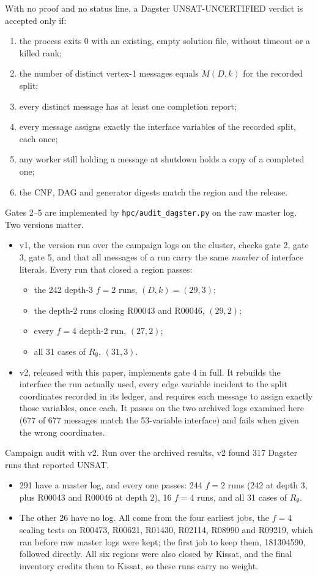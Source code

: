 \documentclass[11pt,a4paper,oneside]{report}
\theoremstyle{definition}
\newcommand{\code}[1]{\texttt{#1}}
\newcommand{\st}[1]{\textsf{#1}}
\begin{document}
With no proof and no status line, a Dagster \st{UNSAT-UNCERTIFIED} verdict is accepted only if:
\begin{enumerate}
\item the process exits 0 with an existing, empty solution file, without timeout or a killed rank;
\item the number of distinct vertex-1 messages equals $M(D,k)$ for the recorded split;
\item every distinct message has at least one completion report;
\item every message assigns exactly the interface variables of the recorded split, each once;
\item any worker still holding a message at shutdown holds a copy of a completed one;
\item the CNF, DAG and generator digests match the region and the release.
\end{enumerate}
Gates 2--5 are implemented by \code{hpc/audit\_dagster.py} on the raw master log. Two versions
matter.
\begin{itemize}
\item v1, the version run over the campaign logs on the cluster, checks gate 2, gate 3,
gate 5, and that all messages of a run carry the same \emph{number} of interface literals. Every
run that closed a region passes:
\begin{itemize}
\item the 242 depth-3 $f=2$ runs, $(D,k)=(29,3)$;
\item the depth-2 runs closing R00043 and R00046, $(29,2)$;
\item every $f=4$ depth-2 run, $(27,2)$;
\item all 31 cases of $R_\emptyset$, $(31,3)$.
\end{itemize}
\item v2, released with this paper, implements gate 4 in full. It rebuilds the
interface the run actually used, every edge variable incident to the split coordinates recorded
in its ledger, and requires each message to assign exactly those variables, once each. It passes
on the two archived logs examined here (677 of 677 messages match the 53-variable interface) and
fails when given the wrong coordinates.
\end{itemize}
Campaign audit with v2. Run over the archived results, v2 found 317 Dagster runs that
reported UNSAT.
\begin{itemize}
\item 291 have a master log, and every one passes: 244 $f=2$ runs (242 at depth 3, plus
R00043 and R00046 at depth 2), 16 $f=4$ runs, and all 31 cases of $R_\emptyset$.
\item The other 26 have no log. All come from the four earliest jobs, the $f=4$ scaling tests on
R00473, R00621, R01430, R02114, R08990 and R09219, which ran before raw master logs were kept;
the first job to keep them, 181304590, followed directly. All six regions were also closed by
Kissat, and the final inventory credits them to Kissat, so these runs carry no weight.
\end{itemize}
\end{document}

